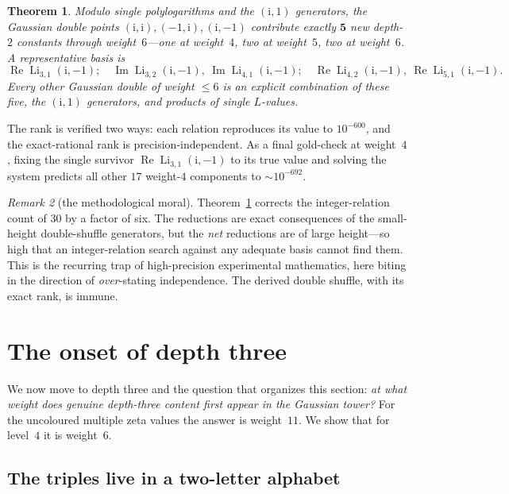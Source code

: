 \documentclass[11pt]{article}
\DeclareMathOperator{\Li}{Li}
\DeclareMathOperator{\Real}{Re}
\DeclareMathOperator{\Imag}{Im}
\newcommand{\iu}{\mathrm{i}}
\theoremstyle{plain}
\newtheorem{theorem}{Theorem}
\theoremstyle{remark}
\newtheorem{remark}[theorem]{Remark}
\begin{document}
\begin{theorem}\label{thm:gauss-5}
Modulo single polylogarithms and the $(\iu,1)$ generators, the Gaussian double points
$(\iu,\iu),(-1,\iu),(\iu,-1)$ contribute exactly $\mathbf 5$ new depth-$2$ constants through
weight~$6$---one at weight~$4$, two at weight~$5$, two at weight~$6$. A representative basis is
\[
  \Real\Li_{3,1}(\iu,-1);\quad \Imag\Li_{3,2}(\iu,-1),\ \Imag\Li_{4,1}(\iu,-1);\quad
  \Real\Li_{4,2}(\iu,-1),\ \Real\Li_{5,1}(\iu,-1).
\]
Every other Gaussian double of weight $\le6$ is an explicit combination of these five, the $(\iu,1)$
generators, and products of single $L$-values.
\end{theorem}

The rank is verified two ways: each relation reproduces its value to $10^{-600}$, and the
exact-rational rank is precision-independent. As a final gold-check at weight~$4$, fixing the single
survivor $\Real\Li_{3,1}(\iu,-1)$ to its true value and solving the system predicts all other $17$
weight-$4$ components to ${\sim}10^{-692}$.

\begin{remark}[the methodological moral]
Theorem~\ref{thm:gauss-5} corrects the integer-relation count of $30$ by a factor of six. The
reductions are exact consequences of the small-height double-shuffle generators, but the
\emph{net} reductions are of large height---so high that an integer-relation search against any
adequate basis cannot find them. This is the recurring trap of high-precision experimental
mathematics, here biting in the direction of \emph{over}-stating independence. The derived double
shuffle, with its exact rank, is immune.
\end{remark}

\section{The onset of depth three}\label{sec:depth3}

We now move to depth three and the question that organizes this section: \emph{at what weight does
genuine depth-three content first appear in the Gaussian tower?} For the uncoloured multiple zeta
values the answer is weight~$11$. We show that for level~$4$ it is weight~$6$.

\subsection{The triples live in a two-letter alphabet}
\end{document}

